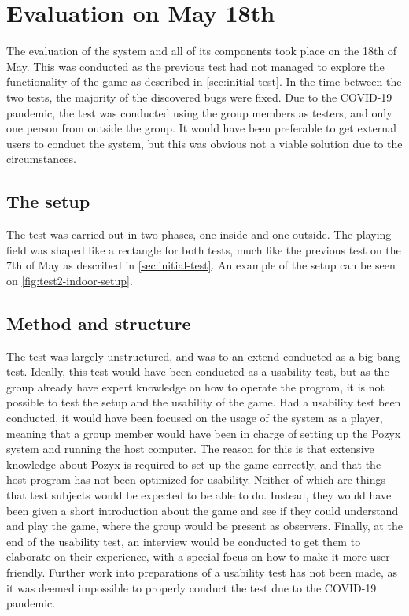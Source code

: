 \section{Evaluation on May 18th}\label{sec:evaluatin_test}
The evaluation of the system and all of its components took place on the 18th of May.
This was conducted as the previous test had not managed to explore the functionality of the game as described in \autoref{sec:initial-test}.
In the time between the two tests, the majority of the discovered bugs were fixed.
Due to the COVID-19 pandemic, the test was conducted using the group members as testers, and only one person from outside the group.
It would have been preferable to get external users to conduct the system, but this was obvious not a viable solution due to the circumstances.

\subsection{The setup}
The test was carried out in two phases, one inside and one outside.
The playing field was shaped like a rectangle for both tests, much like the previous test on the 7th of May as described in \autoref{sec:initial-test}.
An example of the setup can be seen on \autoref{fig:test2-indoor-setup}.

\subsection{Method and structure}
The test was largely unstructured, and was to an extend conducted as a big bang test.
Ideally, this test would have been conducted as a usability test, but as the group already have expert knowledge on how to operate the program, it is not possible to test the setup and the usability of the game.
Had a usability test been conducted, it would have been focused on the usage of the system as a player, meaning that a group member would have been in charge of setting up the Pozyx system and running the host computer.
The reason for this is that extensive knowledge about Pozyx is required to set up the game correctly, and that the host program has not been optimized for usability.
Neither of which are things that test subjects would be expected to be able to do.
Instead, they would have been given a short introduction about the game and see if they could understand and play the game, where the group would be present as observers.
Finally, at the end of the usability test, an interview would be conducted to get them to elaborate on their experience, with a special focus on how to make it more user friendly.
Further work into preparations of a usability test has not been made, as it was deemed impossible to properly conduct the test due to the COVID-19 pandemic.

